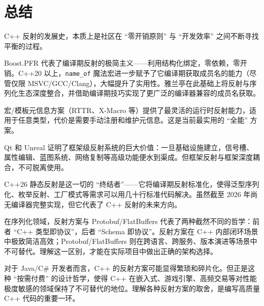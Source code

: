 \documentclass[12pt,a4paper,fontset=fandol]{ctexbook}
\begin{document}
\section{总结}\label{sec:conclusion}

C++ 反射的发展史，本质上是社区在 ``零开销原则'' 与 ``开发效率'' 之间不断寻找平衡的过程。

Boost.PFR 代表了编译期反射的极简主义——利用结构化绑定，零依赖，零开销。C++20 以上，\texttt{name\_of} 魔法宏进一步赋予了它编译期获取成员名的能力（尽管仅限 MSVC/GCC/Clang），大幅提升了实用性。雅兰亭在此基础上将反射与序列化生态深度整合，并借助编译期技巧实现了更广泛的编译器兼容的成员名获取。

宏/模板元信息方案（RTTR、X-Macro 等）提供了最灵活的运行时反射能力，适用于任意类型，代价是需要手动注册和维护元信息。这是当前最实用的 ``全能'' 方案。

Qt 和 Unreal 证明了框架级反射系统的巨大价值：一旦基础设施建立，信号槽、属性编辑、蓝图系统、网络复制等高级功能便水到渠成。但框架反射与框架深度耦合，不可脱离使用。

C++26 静态反射是这一切的 ``终结者''——它将编译期反射标准化，使得泛型序列化、枚举反射、工厂模式等需求可以用几十行标准代码解决。虽然截至 2026 年尚无编译器完整实现，但它代表了 C++ 反射的未来方向。

在序列化领域，反射方案与 Protobuf/FlatBuffers 代表了两种截然不同的哲学：前者 ``C++ 类型即协议''，后者 ``Schema 即协议''。反射方案在 C++ 内部闭环场景中极致简洁高效；Protobuf/FlatBuffers 则在跨语言、跨服务、版本演进等场景中不可替代。理解这一区别，才能在实际项目中做出正确的架构选择。

对于 Java/C\# 开发者而言，C++ 的反射方案可能显得繁琐和碎片化。但正是这种 ``按需付费'' 的设计哲学，使得 C++ 在嵌入式、游戏引擎、高频交易等对性能极度敏感的领域保持了不可替代的地位。理解各种反射方案的取舍，是编写高质量 C++ 代码的重要一环。
\end{document}

